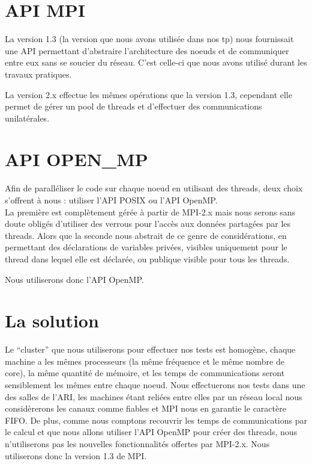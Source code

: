 \section{API MPI}
\par La version 1.3 (la version que nous avons utilisée dans nos tp)
nous fournissait une API permettant d'abstraire 
l'architecture des noeuds et de communiquer entre eux sans se soucier du réseau. C'est
celle-ci que nous avons utilisé durant les travaux pratiques.\\

\par La version 2.x effectue les mêmes opérations que la version 1.3,
cependant elle permet de gérer un pool de threads et d'effectuer des communications unilatérales.\\

\section{API OPEN\_MP}
\par Afin de paralléliser le code sur chaque noeud en utilisant des threads,
deux choix s'offrent à nous : utiliser l'API POSIX ou l'API OpenMP.\\
La première est complètement gérée à partir de MPI-2.x mais nous serons sans doute
obligés d'utiliser des verrous pour l'accès aux données partagées par les threads.
Alors que la seconde nous abstrait de ce genre de considérations, en permettant 
des déclarations de variables privées, visibles uniquement pour le thread dans lequel elle est déclarée, 
ou publique visible pour tous les threads.\\

\par Nous utiliserons donc l'API OpenMP.\\

\section{La solution}
\par Le ``cluster'' que nous utiliserons pour effectuer nos tests 
est homogène, chaque machine a les mêmes processeurs (la même fréquence et le même nombre de core),
la même quantité de mémoire, et les temps de communications seront sensiblement 
les mêmes entre chaque noeud. Nous effectuerons nos tests dans une des salles 
de l'ARI, les machines étant reliées entre elles par un réseau local nous considèrerons 
les canaux comme fiables et MPI nous en garantie le caractère FIFO.
De plus, comme nous comptons recouvrir les temps
de communications par le calcul et que nous allons utiliser l'API OpenMP 
pour créer des threads, nous n'utiliserons pas les nouvelles fonctionnalités offertes
par MPI-2.x. Nous utiliserons donc la version 1.3 de MPI.\\

